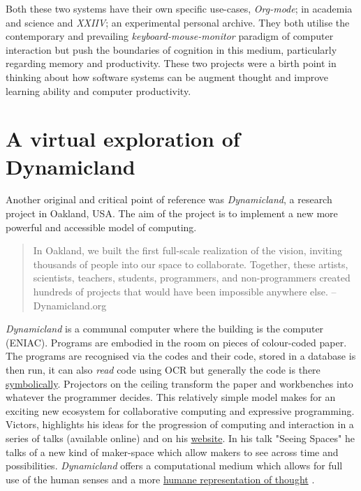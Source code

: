 \documentclass[12pt]{report}
\begin{document}
Both these two systems have their own specific use-cases, \emph{Org-mode}; in
academia and science and \emph{XXIIV}; an experimental personal archive. They both
utilise the contemporary and prevailing \emph{keyboard-mouse-monitor} paradigm
of computer interaction but push the boundaries of cognition in this medium,
particularly regarding memory and productivity. These two projects were a birth
point in thinking about how software systems can be augment thought and improve
learning ability and computer productivity.


\section{A virtual exploration of Dynamicland}
\label{sec:orgc614bd2}

Another original and critical point of reference was \emph{Dynamicland}, a research
project in Oakland, USA. The aim of the project is to implement a new more
powerful and accessible model of computing.

\begin{quote}


In Oakland, we built the first full-scale realization of the vision, inviting
thousands of people into our space to collaborate. Together, these artists,
scientists, teachers, students, programmers, and non-programmers created
hundreds of projects that would have been impossible anywhere else.
-- Dynamicland.org 
\end{quote}


\emph{Dynamicland} is a communal computer where the building is the computer (ENIAC).
Programs are embodied in the room on pieces of colour-coded paper. The programs
are recognised via the codes and their code, stored in a database is then run,
it can also \emph{read} code using OCR but generally the code is there \href{https://thenewstack.io/dynamicland-rethinks-computer-interfaces/}{symbolically}.
Projectors on the ceiling transform the paper and workbenches into whatever the
programmer decides. This relatively simple model makes for an exciting new
ecosystem for collaborative computing and expressive programming. Victors,
highlights his ideas for the progression of computing and interaction in a
series of talks (available online) and on his \href{http://worrydream.com}{website}. In his talk "Seeing
Spaces" he talks of a new kind of maker-space which allow makers to see across
time and possibilities. \emph{Dynamicland} offers a computational medium which allows
for full use of the human senses and a more \href{https://vimeo.com/115154289}{humane representation of thought}
\cite{VictorKayDynamicLand}. \\
\end{document}

